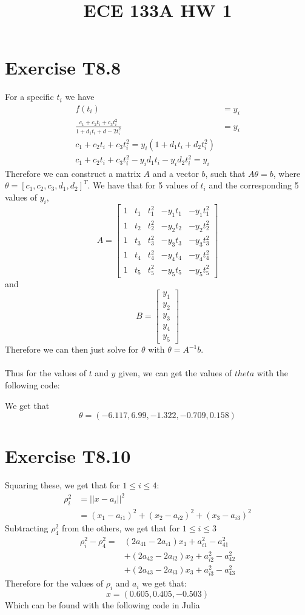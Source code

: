 
\title{ECE 133A HW 1}

\maketitle
\section*{Exercise T8.8}
For a specific $t_i$ we have 
\begin{align*}
    f(t_i)&=y_i\\
    \frac{c_1+c_2t_i+c_3t_i^2}{1+d_1t_i+d-2t_i^2}&=y_i\\
    c_1+c_2t_i+c_3t_i^2=y_i(1+d_1t_i+d_2t_i^2)\\
    c_1+c_2t_i+c_3t_i^2-y_{i}d_1t_i-y_{i}d_2t_i^2=y_i
\end{align*}
Therefore we can construct a matrix $A$ and a vector $b$, such that 
$A\theta=b$, where $\theta=[c_1,c_2,c_3,d_1,d_2]^T$. We have that for 
5 values of $t_i$ and the corresponding 5 values of $y_i$,
$$A=\begin{bmatrix}
    1&t_1&t_1^2&-y_{1}t_1&-y_{1}t_1^2\\
    1&t_2&t_2^2&-y_{2}t_2&-y_{2}t_2^2\\
    1&t_3&t_3^2&-y_{3}t_3&-y_{3}t_3^2\\
    1&t_4&t_4^2&-y_{4}t_4&-y_{4}t_4^2\\
    1&t_5&t_5^2&-y_{5}t_5&-y_{5}t_5^2
\end{bmatrix}$$
and
$$B=\begin{bmatrix}
    y_1\\
    y_2\\
    y_3\\
    y_4\\
    y_5
\end{bmatrix}$$
Therefore we can then just solve for $\theta$ with $\theta=A^{-1}b$.
\\\\
Thus for the values of $t$ and $y$ given, we can get the values of $theta$
with the following code:

We get that
$$\theta=\boxed{(-6.117, 6.99, -1.322, -0.709, 0.158)}$$
\section*{Exercise T8.10}
Squaring these, we get that for $1\leq i\leq 4$:
\begin{align*}
	\rho_i^2&=||x-a_i||^2\\
	&=(x_1-a_{i1})^2+(x_2-a_{i2})^2+(x_3-a_{i3})^2
\end{align*}
Subtracting $\rho_4^2$ from the others, we get that for $1\leq i \leq 3$ 
\begin{align*}
	\rho_i^2-\rho_4^2=&
	(2a_{41}-2a_{i1})x_1+a_{i1}^2-a_{41}^2\\
	&+(2a_{42}-2a_{i2})x_2+a_{i2}^2-a_{42}^2\\
	&+(2a_{43}-2a_{i3})x_3+a_{i3}^2-a_{43}^2
\end{align*}
Therefore for the values of $\rho_i$ and $a_i$ we get that:
$$x=(0.605, 0.405, -0.503)$$
Which can be found with the following code in Julia

